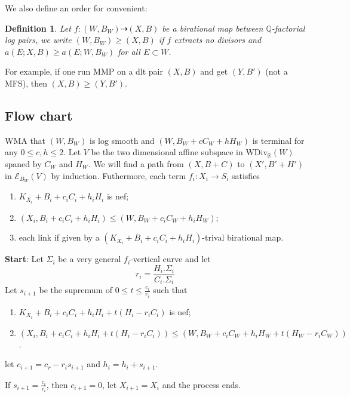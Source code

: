 \documentclass{article}
\newtheorem{defn}{Definition}[section]
\begin{document}
We also define an order for convenient:
\begin{defn}
	Let $ f:(W,B_W)\dashrightarrow (X,B) $ be a birational map between $ \mathbb{Q} $-factorial log pairs, we write $ (W,B_W)\geqslant (X,B) $ if $ f $ extracts no divisors and $ a(E;X,B)\geqslant a(E;W,B_W) $ for all $ E\subset W $.
\end{defn}
For example, if one run MMP on a dlt pair $ (X,B) $ and get $ (Y,B') $ (not a MFS), then $ (X,B)\geqslant (Y,B') $.
\subsection{Flow chart}
WMA that $ (W,B_W) $ is log smooth and $ (W,B_W+cC_W+hH_W) $ is terminal for any $ 0\leqslant c,h \leqslant 2 $.  Let $ V $ be the two dimensional affine subspace in $ \mathrm{WDiv}_\mathbb{R}(W) $ spaned by $ C_W $ and $ H_W $. We will find a path from $ (X,B+C) $ to $ (X',B'+H') $ in $ \mathcal{E}_{B_W}(V) $ by induction. Futhermore, each term $ f_i:X_i\to S_i $ satisfies
\begin{enumerate}
	\item $ K_{X_i}+B_i+c_iC_i+h_iH_i $ is nef;
	\item $ (X_i,B_i+c_iC_i+h_iH_i) \leqslant (W,B_W+c_iC_W+h_iH_W) $;
	\item each link if given by a $ (K_{X_i}+B_i+c_iC_i+h_iH_i ) $-trival birational map.
\end{enumerate}
\textbf{Start}:
Let $ \Sigma_i $ be a very general $ f_i $-vertical curve and let 
$$ r_i=\frac{H_i.\Sigma_i}{C_i.\Sigma_i} $$
Let $ s_{i+1} $ be the supremum of $ 0\leqslant t\leqslant \frac{c_i}{r_i} $ such that
\begin{enumerate}
	\item $ K_{X_i}+B_i+c_iC_i+h_iH_i +t(H_i-r_iC_i)$ is nef;
	\item $ (X_i,B_i+c_iC_i+h_iH_i+t(H_i-r_iC_i)) \leqslant (W,B_W+c_iC_W+h_iH_W+t(H_W-r_iC_W)) $.
\end{enumerate}
let $ c_{i+1}=c_r-r_i s_{i+1}$ and $ h_{i}=h_i+s_{i+1} $.

If $ s_{i+1}=\frac{c_i}{r_i} $, then $ c_{i+1}=0 $, let $ X_{i+1}=X_i $ and the process ends.
\end{document}
